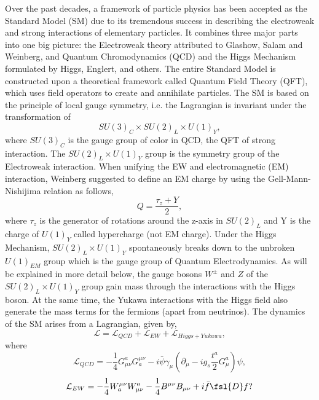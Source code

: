 \documentclass[secnumarabic, graphics,floatfix,nofootinbib,amsmath
tightenlines,nobibnotes,aps,prl,12pt]{revtex4-1}
\begin{document}
Over the past decades, a framework of particle physics has been accepted as the Standard Model (SM) due to its tremendous success in describing the electroweak and strong interactions of elementary particles. It combines three major parts into one big picture: the Electroweak theory attributed to Glashow, Salam and Weinberg\cite{Glashow:1961tr}\cite{Weinberg:1967tq}, and Quantum Chromodynamics (QCD) and the Higgs Mechanism formulated by Higgs, Englert, and others\cite{Englert:1964et}\cite{Higgs:1964pj}. The entire Standard Model is constructed upon a theoretical framework called Quantum Field Theory (QFT), which uses field operators to create and annihilate particles. The SM is based on the principle of local gauge symmetry, i.e. the Lagrangian is invariant under the transformation of
\begin{equation}
SU(3)_C\times SU(2)_L\times U(1)_Y,
\end{equation}
where $SU(3)_C$ is the gauge group of color in QCD, the QFT of strong interaction. The $SU(2)_L\times U(1)_Y$ group is the symmetry group of the Electroweak interaction. When unifying the EW and electromagnetic (EM) interaction, Weinberg suggested to define an EM charge by using the Gell-Mann-Nishijima \cite{Nakano:1953zz}\cite{Nishijima:1955gxk}\cite{Gell-Mann:1956iqa}relation as follows,
\begin{equation}
Q=\frac{\tau_z+Y}{2},
\end{equation}
where $\tau_z$ is the generator of rotations around the z-axis in $SU(2)_L$ and Y is the charge of $U(1)_Y$ called hypercharge (not EM charge). Under the Higgs Mechanism, $SU(2)_L\times U(1)_Y$ spontaneously breaks down to the unbroken $U(1)_{EM}$ group which is the gauge group of Quantum Electrodynamics. As will be explained in more detail below, the gauge bosons $W^{\pm}$ and $Z$ of the $SU(2)_L\times U(1)_Y$ group gain mass through the interactions with the Higgs boson. At the same time, the Yukawa interactions with the Higgs field also generate the mass terms for the fermions (apart from neutrinos).  The dynamics of the SM arises from a Lagrangian, given by,
\begin{equation}
\mathcal{L}=\mathcal{L}_{QCD}+\mathcal{L}_{EW}+\mathcal{L}_{Higgs+Yukawa},
\end{equation}
where
\begin{equation}
\mathcal{L}_{QCD}=-\frac{1}{4}G^a_{\mu\nu}G^{\mu\nu}_a-i\bar{\psi}\gamma_{\mu}(\partial_{\mu}-ig_s\frac{t^a}{2}G^a_{\mu})\psi,
\end{equation}
\begin{equation}
\mathcal{L}_{EW}=-\frac{1}{4}W_a^{\mu\nu}W^a_{\mu\nu}-\frac{1}{4}B^{\mu\nu}B_{\mu\nu}+i\bar{f}\fsl{D}f?
\end{equation}
\end{document}
